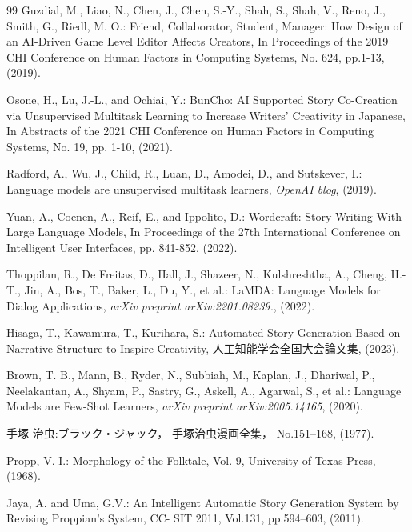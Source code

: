 \documentclass[a4j]{jarticle}
\begin{document}
\begin{thebibliography}{99}
Guzdial, M., Liao, N., Chen, J., Chen, S.-Y., Shah, S., Shah, V., Reno, J., Smith, G., Riedl, M. O.: Friend, Collaborator, Student, Manager: How Design of an AI-Driven Game Level Editor Affects Creators, In Proceedings of the 2019 CHI Conference on Human Factors in Computing Systems, No. 624, pp.1-13, (2019).

Osone, H., Lu, J.-L., and Ochiai, Y.: BunCho: AI Supported Story Co-Creation via Unsupervised Multitask Learning to Increase Writers’ Creativity in Japanese, In Abstracts of the 2021 CHI Conference on Human Factors in Computing Systems, No. 19, pp. 1-10,  (2021). 


Radford, A., Wu, J., Child, R., Luan, D., Amodei, D., and Sutskever, I.: Language models are unsupervised multitask learners, \textit{OpenAI blog}, (2019).

Yuan, A., Coenen, A., Reif, E., and Ippolito, D.: Wordcraft: Story Writing With Large Language Models, In Proceedings of the 27th International Conference on Intelligent User Interfaces, pp. 841-852, (2022).

Thoppilan, R., De Freitas, D., Hall, J., Shazeer, N., Kulshreshtha, A., Cheng, H.-T., Jin, A., Bos, T., Baker, L., Du, Y., et al.: LaMDA: Language Models for Dialog Applications, \textit{arXiv preprint arXiv:2201.08239.}, (2022).

Hisaga, T., Kawamura, T., Kurihara, S.: Automated Story Generation Based on Narrative Structure to Inspire Creativity, 人工知能学会全国大会論文集, (2023).

Brown, T. B., Mann, B., Ryder, N., Subbiah, M., Kaplan, J., Dhariwal, P., Neelakantan, A., Shyam, P., Sastry, G., Askell, A., Agarwal, S., et al.: Language Models are Few-Shot Learners, \textit{arXiv preprint arXiv:2005.14165}, (2020). 

手塚 治虫:ブラック・ジャック， 手塚治虫漫画全集， No.151–168, (1977).

Propp, V. I.: Morphology of the Folktale, Vol. 9, University of Texas Press, (1968).

Jaya, A. and Uma, G.V.: An Intelligent Automatic Story Generation System by Revising Proppian’s System, CC- SIT 2011, Vol.131, pp.594–603, (2011).


\end{thebibliography}
\end{document}
